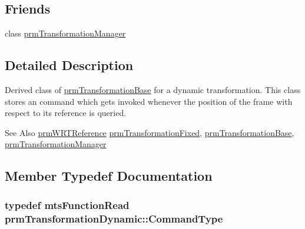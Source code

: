 \subsection*{Friends}
\begin{DoxyCompactItemize}
\item 
class \hyperlink{classprm_transformation_dynamic_af7fc0618e84bdf8b1d22bc2635f29eea}{prm\-Transformation\-Manager}
\end{DoxyCompactItemize}


\subsection{Detailed Description}
Derived class of \hyperlink{classprm_transformation_base}{prm\-Transformation\-Base} for a dynamic transformation. This class stores an command which gets invoked whenever the position of the frame with respect to its reference is queried.

\begin{DoxySeeAlso}{See Also}
\hyperlink{prm_transformation_manager_8h_a10d83094c060676c6409e00c7f2f99d1}{prm\-W\-R\-T\-Reference} \hyperlink{classprm_transformation_fixed}{prm\-Transformation\-Fixed}, \hyperlink{classprm_transformation_base}{prm\-Transformation\-Base}, \hyperlink{classprm_transformation_manager}{prm\-Transformation\-Manager} 
\end{DoxySeeAlso}


\subsection{Member Typedef Documentation}
\hypertarget{classprm_transformation_dynamic_a08d4a3817f09c309060cbd5a70c6cfb9}{
\subsubsection[{Command\-Type}]{\setlength{\rightskip}{0pt plus 5cm}typedef {\bf mts\-Function\-Read} {\bf prm\-Transformation\-Dynamic\-::\-Command\-Type}}}\label{classprm_transformation_dynamic_a08d4a3817f09c309060cbd5a70c6cfb9}


